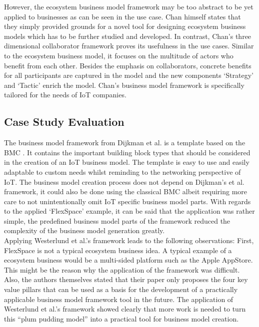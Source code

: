 		However, the ecosystem business model framework may be too abstract to be yet applied to businesses as can be seen in the use case. Chan himself states that they simply provided grounds for a novel tool for designing ecosystem business models which has to be further studied and developed. In contrast, Chan's three dimensional collaborator framework proves its usefulness in the use cases. Similar to the ecosystem business model, it focuses on the multitude of actors who benefit from each other. Besides the emphasis on collaborators, concrete benefits for all participants are captured in the model and the new components `Strategy' and `Tactic' enrich the model. Chan's business model framework is specifically tailored for the needs of IoT companies.
	\vspace{-2em}
	\subsection{Case Study Evaluation}
	\vspace{-1em}
		The business model framework from Dijkman et al. \cite{dijkman} is a template based on the BMC \cite{bmc}. It contains the important building block types that should be considered in the creation of an IoT business model. The template is easy to use and easily adaptable to custom needs whilst reminding to the networking perspective of IoT. The business model creation process does not depend on Dijkman's et al. framework, it could also be done using the classical BMC albeit requiring more care to not unintentionally omit IoT specific business model parts.
		With regards to the applied `FlexSpace' example, it can be said that the application was rather simple, the predefined business model parts of the framework reduced the complexity of the business model generation greatly.\\
		Applying Westerlund et al.'s framework leads to the following observations: First, FlexSpace is not a typical ecosystem business idea. A typical example of a ecosystem business would be a multi-sided platform such as the Apple AppStore. This might be the reason why the application of the framework was difficult. Also, the authors themselves stated that their paper only proposes the four key value pillars that can be used as a basis for the development of a practically applicable business model framework tool in the future. The application of Westerlund et al.'s framework showed clearly that more work is needed to turn this ``plum pudding model'' \cite{westerlund} into a practical tool for business model creation.\\
